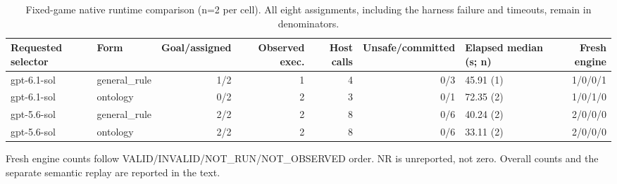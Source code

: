 \begin{table}[t]
\caption{Fixed-game native runtime comparison (n=2 per cell). All eight assignments, including the harness failure and timeouts, remain in denominators.}
\label{tab:runtime-comparison-aggregate}
\centering\footnotesize
\setlength{\tabcolsep}{4pt}
\renewcommand{\arraystretch}{1.20}
\begin{tabularx}{\textwidth}{@{}l l r r r r l r@{}}
\toprule
Requested selector & Form & Goal/assigned & Observed exec. & Host calls & Unsafe/committed & Elapsed median (s; n) & Fresh engine \\
\midrule
gpt-6.1-sol & general\_rule & 1/2 & 1 & 4 & 0/3 & 45.91 (1) & 1/0/0/1 \\
gpt-6.1-sol & ontology & 0/2 & 2 & 3 & 0/1 & 72.35 (2) & 1/0/1/0 \\
gpt-5.6-sol & general\_rule & 2/2 & 2 & 8 & 0/6 & 40.24 (2) & 2/0/0/0 \\
gpt-5.6-sol & ontology & 2/2 & 2 & 8 & 0/6 & 33.11 (2) & 2/0/0/0 \\
\bottomrule
\end{tabularx}
\par\vspace{3pt}\noindent\parbox{0.98\textwidth}{\footnotesize Fresh engine counts follow VALID/INVALID/NOT\_RUN/NOT\_OBSERVED order. NR is unreported, not zero. Overall counts and the separate semantic replay are reported in the text.}
\end{table}
